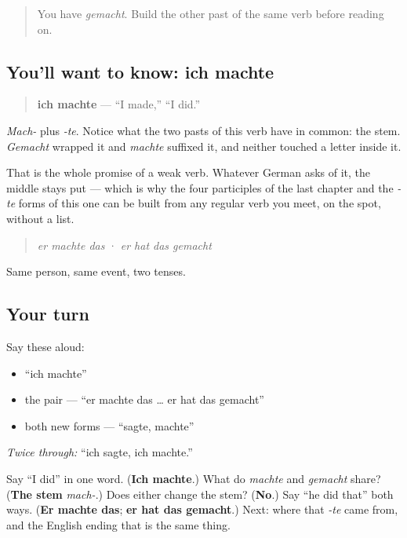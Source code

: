 \label{lesson:GE-C15-machte}



\begin{quote}
You have \emph{gemacht}. Build the other past of the same verb before reading on.
\end{quote}

\subsection*{You'll want to know: ich machte}
\begin{quote}
\textbf{ich machte} — \textquotedblleft{}I made,\textquotedblright{} \textquotedblleft{}I did.\textquotedblright{}
\end{quote}

\emph{Mach-} plus \emph{-te}. Notice what the two pasts of this verb have in common: the stem. \emph{Gemacht} wrapped it and \emph{machte} suffixed it, and neither touched a letter inside it.

That is the whole promise of a weak verb. Whatever German asks of it, the middle stays put — which is why the four participles of the last chapter and the \emph{-te} forms of this one can be built from any regular verb you meet, on the spot, without a list.

\begin{quote}
\emph{er machte das} · \emph{er hat das gemacht}
\end{quote}

Same person, same event, two tenses.

\subsection*{Your turn}
Say these aloud:

\begin{itemize}
\raggedright
  \item \textquotedblleft{}ich machte\textquotedblright{}
  \item the pair — \textquotedblleft{}er machte das … er hat das gemacht\textquotedblright{}
  \item both new forms — \textquotedblleft{}sagte, machte\textquotedblright{}
\end{itemize}

\emph{Twice through:} \textquotedblleft{}ich sagte, ich machte.\textquotedblright{}

\begin{tcolorbox}[breakable,colback=teal!4,colframe=teal!35!black,title={Before you move on}]
Say \textquotedblleft{}I did\textquotedblright{} in one word. (\textbf{Ich machte}.) What do \emph{machte} and \emph{gemacht} share? (\textbf{The stem} \emph{mach-}.) Does either change the stem? (\textbf{No}.) Say \textquotedblleft{}he did that\textquotedblright{} both ways. (\textbf{Er machte das}; \textbf{er hat das gemacht}.) Next: where that \emph{-te} came from, and the English ending that is the same thing.
\end{tcolorbox}
